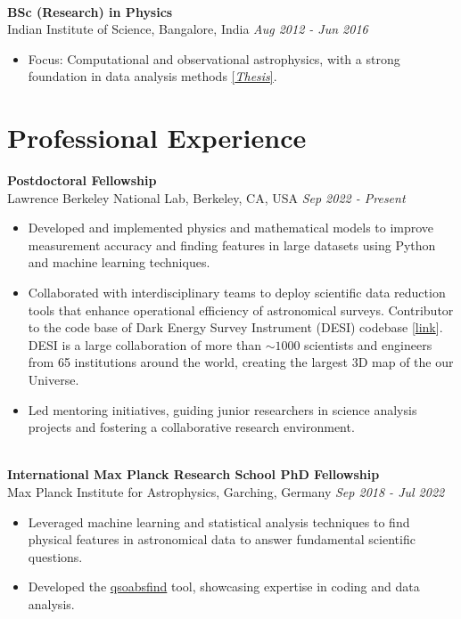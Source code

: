 \documentclass[a4paper,10pt]{article}
\begin{document}
\noindent\\
\textbf{BSc (Research) in Physics} \\
Indian Institute of Science, Bangalore, India \hfill \textit{Aug 2012 - Jun 2016} \\
\begin{itemize}[noitemsep, topsep=0pt]
    \item Focus: Computational and observational astrophysics, with a strong foundation in data analysis
methods \href{https://raw.githubusercontent.com/abhi0395/mycv/main/files/BS_thesis.pdf}{[\textit{Thesis}]}.
\end{itemize}

\section*{Professional Experience}
\noindent
\textbf{Postdoctoral Fellowship} \\
Lawrence Berkeley National Lab, Berkeley, CA, USA \hfill \textit{Sep 2022 - Present} \\
\begin{itemize}[noitemsep, topsep=0pt]
    \item Developed and implemented physics and mathematical models to improve measurement accuracy and finding features in large datasets using Python and machine learning techniques. 
     \item Collaborated with interdisciplinary teams to deploy scientific data reduction tools that enhance operational efficiency of astronomical surveys. Contributor to the code base of Dark Energy Survey Instrument (DESI) codebase [\href{https://github.com/desihub}{link}]. DESI is a large collaboration of more than $\sim1000$ scientists and engineers from 65 institutions around the world, creating the largest 3D map of the our Universe.
        \item Led mentoring initiatives, guiding junior researchers in science analysis projects and fostering a collaborative research environment.
\end{itemize}

\noindent \\
\textbf{International Max Planck Research School PhD Fellowship} \\
Max Planck Institute for Astrophysics, Garching, Germany \hfill \textit{Sep 2018 - Jul 2022} \\
\begin{itemize}[noitemsep, topsep=0pt]
    \item Leveraged machine learning and statistical analysis techniques to find physical features in astronomical data to answer fundamental scientific questions.
    \item Developed the \href{https://github.com/abhi0395/qsoabsfind}{qsoabsfind} tool, showcasing expertise in coding and data analysis.
\end{itemize}
\end{document}
